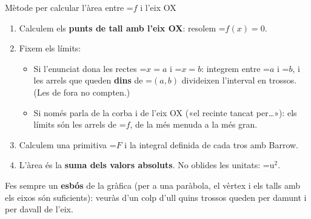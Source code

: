 \documentclass[11pt,a4paper]{article}
\newcommand{\fmm}[1]{\setbox0=\hbox{$#1$}\ifdim\wd0>\linewidth\[#1\]\else\mbox{\box0}\fi}
\begin{document}
  
\begin{fmprop}{Mètode per calcular l'àrea entre \fmm{f} i l'eix OX}
\begin{enumerate}
\item Calculem els \textbf{punts de tall amb l'eix OX}: resolem \fmm{f(x)=0}.
\item Fixem els límits:
          
\begin{itemize}
\item Si l'enunciat dona les rectes \fmm{x=a} i \fmm{x=b}: integrem entre \fmm{a} i \fmm{b}, i les arrels que queden \textbf{dins} de \fmm{(a,b)} divideixen l'interval en trossos. (Les de fora no compten.)
\item Si només parla de la corba i de l'eix OX («el recinte tancat per\dots{}»): els límits són les arrels de \fmm{f}, de la més menuda a la més gran.
\end{itemize}
\item Calculem una primitiva \fmm{F} i la integral definida de cada tros amb Barrow.
\item L'àrea és la \textbf{suma dels valors absoluts}. No oblides les unitats: \fmm{\text{u}^2}.
\end{enumerate}

      
\begin{fmnote}Fes sempre un \textbf{esbós} de la gràfica (per a una paràbola, el vèrtex i els talls amb els eixos són suficients): veuràs d'un colp d'ull quins trossos queden per damunt i per davall de l'eix.\end{fmnote}
\end{fmprop}
\end{document}
